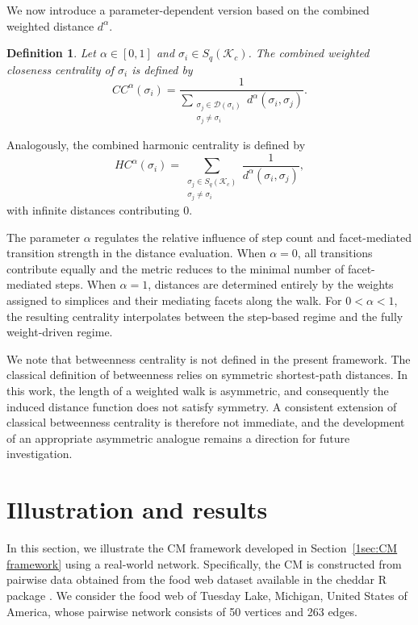 \documentclass[12pt]{article}
\theoremstyle{normalhead_nobrackets}
\newtheorem{definition}{Definition}[section]
\theoremstyle{exampstyle}
\begin{document}
We now introduce a parameter-dependent version based on the combined weighted distance $d^{\alpha}$.

\begin{definition}
Let $\alpha \in [0,1]$ and $\sigma_i \in S_q(\mathcal{K}_c)$. 
The combined weighted closeness centrality of $\sigma_i$ is defined by
\[
CC^{\alpha}(\sigma_i)
=
\frac{1}{\displaystyle 
\sum_{\substack{\sigma_j \in \mathcal{D}(\sigma_i) \\ \sigma_j \neq \sigma_i}}
d^{\alpha}(\sigma_i,\sigma_j)}.
\]
\end{definition}

Analogously, the combined harmonic centrality is defined by
\[
HC^{\alpha}(\sigma_i)
=
\sum_{\substack{\sigma_j \in S_q(\mathcal{K}_c) \\ \sigma_j \neq \sigma_i}}
\frac{1}{d^{\alpha}(\sigma_i,\sigma_j)},
\]
with infinite distances contributing $0$.

The parameter $\alpha$ regulates the relative influence of step count and facet-mediated transition strength in the distance evaluation. 
When $\alpha = 0$, all transitions contribute equally and the metric reduces to the minimal number of facet-mediated steps. 
When $\alpha = 1$, distances are determined entirely by the weights assigned to simplices and their mediating facets along the walk.
For $0 < \alpha < 1$, the resulting centrality interpolates between the step-based regime and the fully weight-driven regime.

We note that betweenness centrality is not defined in the present framework. The classical definition of betweenness relies on symmetric shortest-path distances. In this work, the length of a weighted walk is asymmetric, and consequently the induced distance function does not satisfy symmetry. A consistent extension of classical betweenness centrality is therefore not immediate, and the development of an appropriate asymmetric analogue remains a direction for future investigation.





\section{Illustration and results}\label{1sec:Illustration of CM}
In this section, we illustrate the CM framework developed in Section~\ref{1sec:CM framework} using a real-world network. Specifically, the CM is constructed from pairwise data obtained from the food web dataset available in the cheddar R package \cite{hudson2013cheddar}. We consider the food web of Tuesday Lake, Michigan, United States of America, whose pairwise network consists of 50 vertices and 263 edges.
\end{document}
